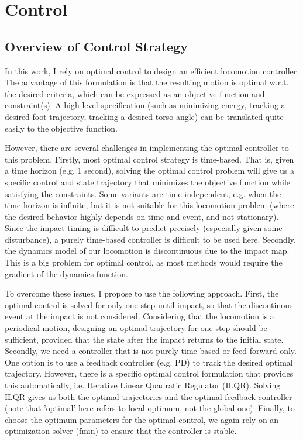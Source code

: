 \section{Control}
\label{sec:control}


\subsection{Overview of Control Strategy}
\label{sec:overview}

In this work, I rely on optimal control to design an efficient locomotion controller. The advantage of this formulation is that the resulting motion is optimal w.r.t. the desired criteria, which can be expressed as an objective function and constraint(s). A high level specification (such as minimizing energy, tracking a desired foot trajectory, tracking a desired torso angle) can be translated quite easily to the objective function. 

However, there are several challenges in implementing the optimal controller to this problem. Firstly, most optimal control strategy is time-based. That is, given a time horizon (e.g. 1 second), solving the optimal control problem will give us a specific control and state trajectory that minimizes the objective function while satisfying the constraints. Some variants are time independent, e.g. when the time horizon is infinite, but it is not suitable for this locomotion problem (where the desired behavior highly depends on time and event, and not stationary). Since the impact timing is difficult to predict precisely (especially given some disturbance), a purely time-based controller is difficult to be used here. Secondly, the dynamics model of our locomotion is discontinuous due to the impact map. This is a big problem for optimal control, as most methods would require the gradient of the dynamics function. 

To overcome these issues, I propose to use the following approach. First, the optimal control is solved for only one step until impact, so that the discontinous event at the impact is not considered. Considering that the locomotion is a periodical motion, designing an optimal trajectory for one step should be sufficient, provided that the state after the impact returns to the initial state. 
Secondly, we need a controller that is not purely time based or feed forward only. One option is to use a feedback controller (e.g. PD) to track the desired optimal trajectory. However, there is a specific optimal control formulation that provides this automatically, i.e. Iterative Linear Quadratic Regulator (ILQR). Solving ILQR gives us both the optimal trajectories and the optimal feedback controller (note that 'optimal' here refers to local optimum, not the global one). 
Finally, to choose the optimum parameters for the optimal control, we again rely on an optimization solver (fmin) to ensure that the controller is stable.

